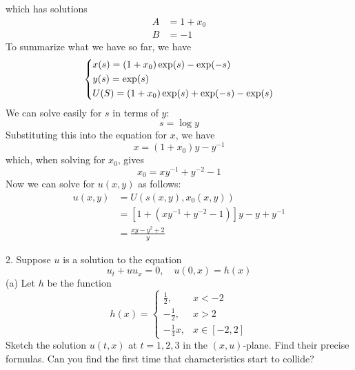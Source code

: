 \documentclass{article}
\begin{document}
%
which has solutions
%
\begin{align*}
    A &= 1 + x_0 \\
    B &= -1
\end{align*}
%
To summarize what we have so far, we have
%
\begin{equation*}
    \begin{dcases}
        x(s) = (1 + x_0) \exp(s) - \exp(-s) \\
        y(s) = \exp(s) \\
        U(S) = (1 + x_0) \exp(s) + \exp(-s) - \exp(s)
    \end{dcases}
\end{equation*}
%
We can solve easily for $s$ in terms of $y$:
%
\begin{equation*}
    s = \log y
\end{equation*}
%
Substituting this into the equation for $x$, we have
%
\begin{equation*}
    x = (1 + x_0) y - y^{-1}
\end{equation*}
%
which, when solving for $x_0$, gives
%
\begin{equation*}
    x_0 = x y^{-1} + y^{-2} - 1
\end{equation*}
%
Now we can solve for $u(x, y)$ as follows:
%
\begin{align*}
    u(x, y) &= U(s(x, y), x_0(x, y)) \\
            &= \left[1 + \left(x y^{-1} + y^{-2} - 1\right)\right] y - y + y^{-1} \\
            &= \frac{x y - y^2 + 2}{y}
\end{align*}

\newpage

2. Suppose $u$ is a solution to the equation
%
\begin{equation*}
    u_t + u u_x = 0, \quad u(0, x) = h(x)
\end{equation*}
%
(a) Let $h$ be the function
%
\begin{equation*}
    h(x) =
        \begin{cases}
            \frac{1}{2}, & x < -2 \\
            -\frac{1}{2}, & x > 2 \\
            -\frac{1}{4} x, & x \in [-2, 2]
        \end{cases}
\end{equation*}
%
Sketch the solution $u(t, x)$ at $t = 1, 2, 3$ in the $(x, u)$-plane.
Find their precise formulas. Can you find the first time that
characteristics start to collide?
\end{document}
